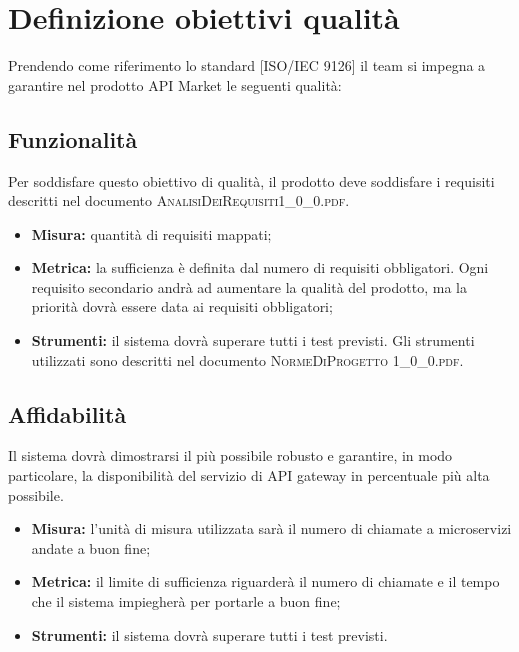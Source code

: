 \newpage
\section{Definizione obiettivi qualità}
	
	Prendendo come riferimento lo standard [ISO/IEC 9126] il team si impegna a
	garantire nel prodotto API Market le seguenti qualità:
	
	\subsection{Funzionalità}
		Per soddisfare questo obiettivo di qualità, il prodotto deve soddisfare i requisiti descritti nel documento \textsc{AnalisiDeiRequisiti1\_0\_0.pdf}.  
		
		\begin{itemize}
			\item \textbf{Misura: }quantità di requisiti mappati;
			\item \textbf{Metrica: }la sufficienza è definita dal numero di requisiti obbligatori. Ogni requisito secondario andrà ad aumentare la qualità del prodotto, ma la priorità dovrà essere data ai requisiti obbligatori;
			\item \textbf{Strumenti: }il sistema dovrà superare tutti i test previsti. Gli strumenti utilizzati sono descritti nel documento \textsc{NormeDiProgetto 1\_0\_0.pdf}.
			
		\end{itemize}
	
	\subsection{Affidabilità}
		Il sistema dovrà dimostrarsi il più possibile robusto e garantire, in modo particolare, la disponibilità del servizio di API gateway in percentuale più alta possibile. 
		
		\begin{itemize}
			\item \textbf{Misura: }l’unità di misura utilizzata sarà il numero di chiamate a microservizi andate a buon fine;
			\item \textbf{Metrica: }il limite di sufficienza riguarderà il numero di chiamate e il tempo che il sistema impiegherà per portarle a buon fine;
			\item \textbf{Strumenti:} il sistema dovrà superare tutti i test previsti.
			
		\end{itemize}
	
